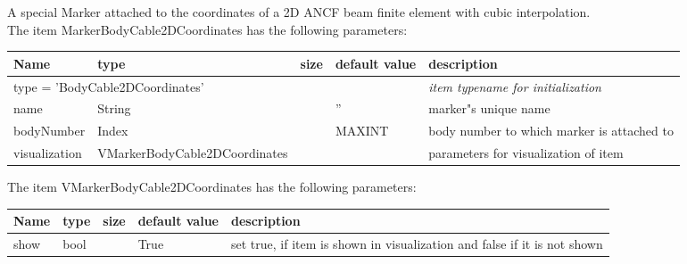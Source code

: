A special Marker attached to the coordinates of a 2D ANCF beam finite element with cubic interpolation.
 \\The item MarkerBodyCable2DCoordinates has the following parameters:
\begin{center}
  \footnotesize
  \begin{longtable}{| p{4.5cm} | p{2.5cm} | p{0.5cm} | p{2.5cm} | p{6cm} |}
    \hline
    \bf Name & \bf type & \bf size & \bf default value & \bf description \\ \hline
    \multicolumn{4}{l}{\parbox{10cm}{type = 'BodyCable2DCoordinates'}} & \multicolumn{1}{l}{\parbox{6cm}{\it item typename for initialization}}\\ \hline
    name &     String &      &     '' &     marker"s unique name\\ \hline
    bodyNumber &     Index &      &     MAXINT &     body number to which marker is attached to\\ \hline
    visualization & VMarkerBodyCable2DCoordinates & & & parameters for visualization of item \\ \hline
	  \end{longtable}
	\end{center}
The item VMarkerBodyCable2DCoordinates has the following parameters:
\begin{center}
  \footnotesize
  \begin{longtable}{| p{4.5cm} | p{2.5cm} | p{0.5cm} | p{2.5cm} | p{6cm} |}
    \hline
    \bf Name & \bf type & \bf size & \bf default value & \bf description \\ \hline
    show &     bool &      &     True &     set true, if item is shown in visualization and false if it is not shown\\ \hline
	  \end{longtable}
	\end{center}


